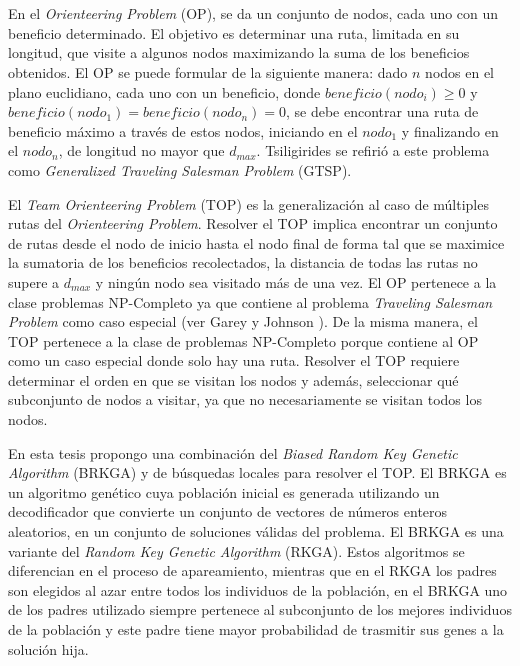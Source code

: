 
\chapter*{\tituloAbstractEs}

\noindent En el \textit{Orienteering Problem} (OP), se da un conjunto de nodos, cada uno con un beneficio determinado. El objetivo es determinar una ruta, limitada en su longitud, que visite a algunos nodos maximizando la suma de los beneficios obtenidos. El OP se puede formular de la siguiente manera: dado $n$ nodos en el plano euclidiano, cada uno con un beneficio, donde $beneficio(nodo_i) \geq 0$ y $beneficio(nodo_1) = beneficio(nodo_n) = 0$, se debe encontrar una ruta de beneficio máximo a través de estos nodos, iniciando en el $nodo_1$ y finalizando en el $nodo_n$, de longitud no mayor que $d_{max}$. Tsiligirides \cite{Tsiligirides} se refirió a este problema como \textit{Generalized Traveling Salesman Problem} (GTSP).

\bigskip

El \textit{Team Orienteering Problem} (TOP) es la generalización al caso de múltiples rutas del \textit{Orienteering Problem}. Resolver el TOP implica encontrar un conjunto de rutas desde el nodo de inicio hasta el nodo final de forma tal que se maximice la sumatoria de los beneficios recolectados, la distancia de todas las rutas no supere a $d_{max}$ y ningún nodo sea visitado más de una vez. El OP pertenece a la clase problemas NP-Completo ya que contiene al problema \textit{Traveling Salesman Problem} como caso especial (ver Garey y Johnson \cite{GareyJohnson}). De la misma manera, el TOP pertenece a la clase de problemas NP-Completo porque contiene al OP como un caso especial donde solo hay una ruta. Resolver el TOP requiere determinar el orden en que se visitan los nodos y además, seleccionar qué subconjunto de nodos a visitar, ya que no necesariamente se visitan todos los nodos.

\bigskip

En esta tesis propongo una combinación del \textit{Biased Random Key Genetic Algorithm} (BRKGA) y de búsquedas locales para resolver el TOP. El BRKGA es un algoritmo genético cuya población inicial es generada utilizando un decodificador que convierte un conjunto de vectores de números enteros aleatorios, en un conjunto de soluciones válidas del problema. El BRKGA es una variante del \textit{Random Key Genetic Algorithm} (RKGA). Estos algoritmos se diferencian en el proceso de apareamiento, mientras que en el RKGA los padres son elegidos al azar entre todos los individuos de la población, en el BRKGA uno de los padres utilizado siempre pertenece al subconjunto de los mejores individuos de la población y este padre tiene mayor probabilidad de trasmitir sus genes a la solución hija.


